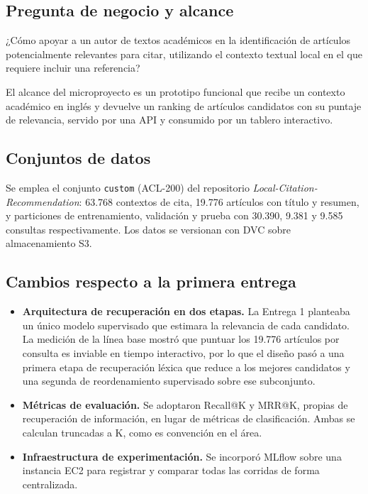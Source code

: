 \documentclass[11pt]{article}
\newcommand{\notabox}[1]{%
  \begin{tcolorbox}[colback=lightgray, colframe=accentblue, boxrule=0.6pt,
    left=8pt, right=8pt, top=5pt, bottom=5pt, arc=2pt]
    \small #1
  \end{tcolorbox}
}
\begin{document}
\subsection{Pregunta de negocio y alcance}

\notabox{¿Cómo apoyar a un autor de textos académicos en la identificación de artículos potencialmente relevantes para citar, utilizando el contexto textual local en el que requiere incluir una referencia?}

El alcance del microproyecto es un prototipo funcional que recibe un contexto académico en inglés y devuelve un ranking de artículos candidatos con su puntaje de relevancia, servido por una API y consumido por un tablero interactivo.

\subsection{Conjuntos de datos}

Se emplea el conjunto \texttt{custom} (ACL-200) del repositorio \textit{Local-Citation-Recommendation}: 63.768 contextos de cita, 19.776 artículos con título y resumen, y particiones de entrenamiento, validación y prueba con 30.390, 9.381 y 9.585 consultas respectivamente. Los datos se versionan con DVC sobre almacenamiento S3.

\subsection{Cambios respecto a la primera entrega}

\begin{itemize}[leftmargin=1.4em, itemsep=1pt, topsep=2pt]
  \item \textbf{Arquitectura de recuperación en dos etapas.} La Entrega 1 planteaba un único modelo supervisado que estimara la relevancia de cada candidato. La medición de la línea base mostró que puntuar los 19.776 artículos por consulta es inviable en tiempo interactivo, por lo que el diseño pasó a una primera etapa de recuperación léxica que reduce a los mejores candidatos y una segunda de reordenamiento supervisado sobre ese subconjunto.
  \item \textbf{Métricas de evaluación.} Se adoptaron Recall@K y MRR@K, propias de recuperación de información, en lugar de métricas de clasificación. Ambas se calculan truncadas a K, como es convención en el área.
  \item \textbf{Infraestructura de experimentación.} Se incorporó MLflow sobre una instancia EC2 para registrar y comparar todas las corridas de forma centralizada.
\end{itemize}
\end{document}
